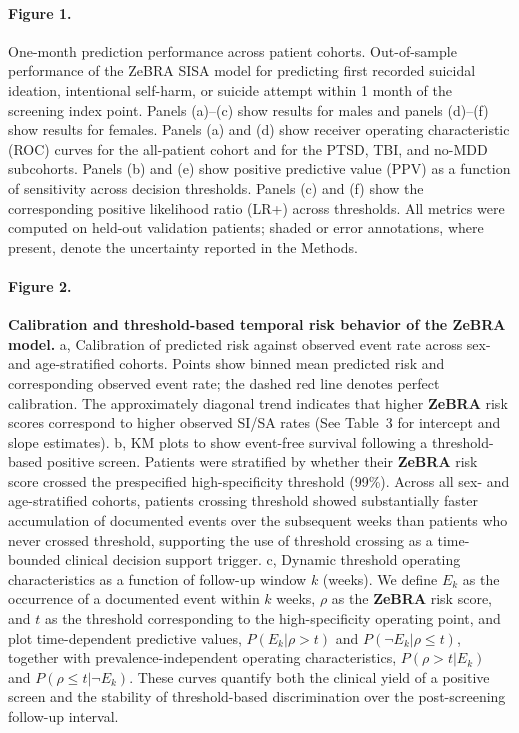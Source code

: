 \documentclass[onecolumn, compsoc,11pt]{IEEEtran}
\def\zebra{\textbf{ZeBRA}\xspace}
\def\zebra{\textbf{ZeBRA}\xspace}
\begin{document}
\paragraph{Figure 1.} 
One-month prediction performance across patient cohorts. Out-of-sample performance of the ZeBRA SISA model for predicting first recorded suicidal ideation, intentional self-harm, or suicide attempt within 1 month of the screening index point. Panels (a)–(c) show results for males and panels (d)–(f) show results for females. Panels (a) and (d) show receiver operating characteristic (ROC) curves for the all-patient cohort and for the PTSD, TBI, and no-MDD subcohorts. Panels (b) and (e) show positive predictive value (PPV) as a function of sensitivity across decision thresholds. Panels (c) and (f) show the corresponding positive likelihood ratio (LR+) across thresholds. All metrics were computed on held-out validation patients; shaded or error annotations, where present, denote the uncertainty reported in the Methods.


\paragraph{Figure 2.} \textbf{Calibration and threshold-based temporal risk behavior of the \zebra model.}
a, Calibration of predicted risk against observed event rate across sex- and age-stratified cohorts. Points show binned mean predicted risk and corresponding observed event rate; the dashed red line denotes perfect calibration. The approximately diagonal trend indicates that higher \zebra risk scores correspond to higher observed SI/SA rates (See Table~3 for intercept and slope estimates).
b, KM plots to show event-free survival following a threshold-based positive screen. Patients were stratified by whether their \zebra risk score crossed the prespecified high-specificity threshold (99\%). Across all sex- and age-stratified cohorts, patients crossing threshold showed substantially faster accumulation of documented events over the subsequent weeks than patients who never crossed threshold, supporting the use of threshold crossing as a time-bounded clinical decision support trigger.
c, Dynamic threshold operating characteristics as a function of follow-up window $k$ (weeks). We define $E_k$ as the occurrence of a documented event within $k$ weeks, $\rho$ as the \zebra risk score, and $t$ as the threshold corresponding to the high-specificity operating point, and plot  time-dependent predictive values, $P(E_k \vert \rho > t)$ and $P(\neg E_k \vert \rho \leq t)$, together with prevalence-independent operating characteristics, $P(\rho > t \vert E_k)$ and $P(\rho \leq t \vert \neg E_k)$. These curves quantify both the clinical yield of a positive screen and the stability of threshold-based discrimination over the post-screening follow-up interval.
\end{document}
